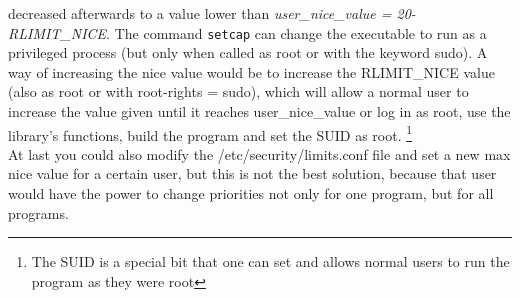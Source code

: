 decreased afterwards to a value lower than \textit{user\_nice\_value = 20-RLIMIT\_NICE}. The command \texttt{setcap} can change the executable to
run as a privileged process (but only when called as root or with the keyword sudo). A way of
increasing the nice value would be to increase the RLIMIT\_NICE value (also as root or with root-rights = sudo), which will allow a normal user to increase the value given until it reaches
\dq user\_nice\_value\dq{} or log in as root, use the library's functions, build the program and set the SUID as root.
\footnote{The SUID is a special bit that one can set and allows normal users to run the program as they
were root}\\
At last you could also modify the \dq/etc/security/limits.conf\dq{} file and set a new max nice value for a
certain user, but this is not the best solution, because that user would have the power to change
priorities not only for one program, but for all programs.
